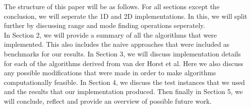 \documentclass{article}
\newcommand{\fbnote}[1]{{}}
\begin{document}
{    \fbnote{Based on Frank's feedback: I wanted to still fully split 2D range finding and 2D mode finding, however I didn't have the time to fully seperate the two as that would require major rewrites of certain parts. Current setup isn't ideal, however I hope it is clear enough to a reader that the mode is a halfplane query.}
    The structure of this paper will be as follows. For all sections except the conclusion, we will seperate the 1D and 2D implementations. In this, we will split further by discussing range and mode finding operations seperately.\\
     In Section 2, we will provide a summary of all the algorithms that were implemented. This also includes the naive approaches that were included as benchmarks for our results. In Section 3, we will discuss implementation details for each of the algorithms derived from van der Horst et al. Here we also discuss any possible modifications that were made in order to make algorithms computationally feasible. In Section 4, we discuss the test instances that we used and the results that our implementation produced. Then finally in Section 5, we will conclude, reflect and provide an overview of possible future work. 
}
\end{document}
